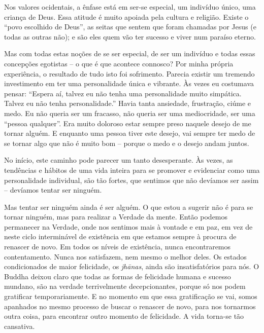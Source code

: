 Nos valores ocidentais, a ênfase está em ser-se especial, um indivíduo único,
uma criança de Deus. Essa atitude é muito apoiada pela cultura e religião.
Existe o ``povo escolhido de Deus'', as seitas que sentem que foram chamadas por
Jesus (e todas as outras não); e são eles quem vão ter sucesso e viver num
paraíso eterno.

Mas com todas estas noções de se ser especial, de ser um indivíduo e todas essas
concepções egotistas -- o que é que acontece connosco? Por minha própria
experiência, o resultado de tudo isto foi sofrimento. Parecia existir um
tremendo investimento em ter uma personalidade única e vibrante. Às vezes eu
costumava pensar: ``Espera aí, talvez eu não tenha uma personalidade muito
simpática. Talvez eu não tenha personalidade.'' Havia tanta ansiedade,
frustração, ciúme e medo. Eu não queria ser um fracasso, não queria ser uma
mediocridade, ser uma ``pessoa qualquer''. Era muito doloroso estar sempre preso
naquele desejo de me tornar alguém. E enquanto uma pessoa tiver este desejo, vai
sempre ter medo de se tornar algo que não é muito bom -- porque o medo e o
desejo andam juntos.

No início, este caminho pode parecer um tanto desesperante. Às vezes, as
tendências e hábitos de uma vida inteira para se promover e evidenciar como uma
personalidade individual, são tão fortes, que sentimos que não devíamos ser
assim -- devíamos tentar ser ninguém.

Mas tentar ser ninguém ainda é ser alguém. O que estou a sugerir não é para se
tornar ninguém, mas para realizar a Verdade da mente. Então podemos permanecer
na Verdade, onde nos sentimos mais à vontade e em paz, em vez de neste ciclo
interminável de existência em que estamos sempre à procura de renascer de novo.
Em todos os níveis de existência, nunca encontraremos contentamento. Nunca nos
satisfazem, nem mesmo o melhor deles. Os estados condicionados de maior
felicidade, os \emph{jhānas}, ainda são insatisfatórios para nós. O Buddha
deixou claro que todas as formas de felicidade humana e sucesso mundano, são na
verdade terrivelmente decepcionantes, porque só nos podem gratificar
temporariamente. E no momento em que essa gratificação se vai, somos apanhados
no mesmo processo de buscar o renascer de novo, para nos tornarmos outra coisa,
para encontrar outro momento de felicidade. A vida torna-se tão cansativa.

